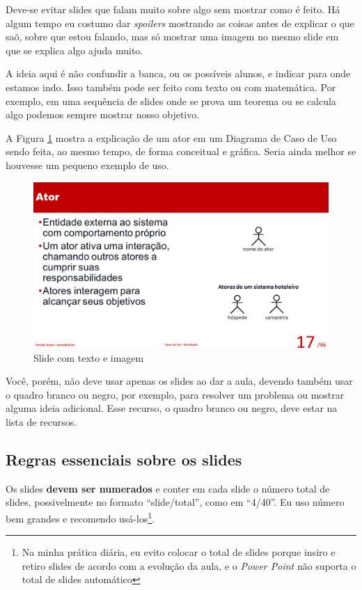 \documentclass{article}
\def\tam{0.6}
\begin{document}
Deve-se evitar slides que falam muito sobre algo sem mostrar como é feito. Há algum tempo eu costumo dar \textit{spoilers} mostrando as coisas antes de explicar o que saõ, sobre que estou falando, mas só mostrar uma imagem no mesmo slide em que se explica algo ajuda muito.

A ideia aqui é não confundir a banca, ou os possíveis alunos, e indicar para onde estamos indo. Isso também pode ser feito com texto ou com matemática. Por exemplo, em uma sequência de slides onde se prova um teorema ou se calcula algo podemos sempre mostrar nosso objetivo.

A Figura \ref{fig:teximag} mostra a explicação de um ator em um Diagrama de Caso de Uso sendo feita, ao mesmo tempo, de forma conceitual e gráfica. Seria ainda melhor se houvesse um pequeno exemplo de uso.

\begin{figure}[hbt]
    \centering
    \includegraphics[width=\tam\linewidth]{imagens/slidecomimage.png}
    \caption{Slide com texto e imagem}
    \label{fig:teximag}
\end{figure}

Você, porém, não deve usar apenas os slides ao dar a aula, devendo também usar o quadro branco ou negro, por exemplo, para resolver um problema ou mostrar alguma ideia adicional. Esse recurso, o quadro branco ou negro, deve estar na lista de recursos.


\subsection{Regras essenciais sobre os slides}

Os slides \textbf{devem ser numerados} e conter em cada slide o número total de slides, possivelmente no formato ``slide/total'', como em ``4/40''. Eu uso número bem grandes e recomendo usá-los\footnote{Na minha prática diária, eu evito colocar o total de slides porque insiro e retiro slides de acordo com a evolução da aula, e o \textit{Power Point} não suporta o  total de slides automático}.
\end{document}
